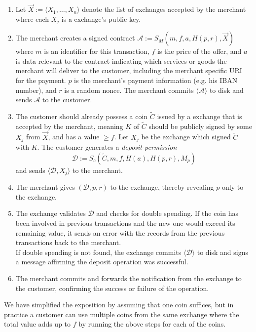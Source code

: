 \documentclass{llncs}
\begin{document}
\begin{enumerate}
\item \label{contract}
  Let $\vec{X} := \langle X_1, \ldots, X_n \rangle$ denote the list of
  exchanges accepted by the merchant where each $X_j$ is a exchange's
  public key.
\item
  The merchant creates a signed contract
    $\mathcal{A} := S_M(m, f, a, H(p, r), \vec{X})$
  where $m$ is an identifier for this transaction, $f$ is the price of the offer,
  and $a$ is data relevant
  to the contract indicating which services or goods the merchant will
  deliver to the customer, including the merchant specific URI for the payment.
  $p$ is the merchant's payment information (e.g. his IBAN number), and
  $r$ is a random nonce.  The merchant commits $\langle \mathcal{A} \rangle$
  to disk and sends $\mathcal{A}$ to the customer.
\item
  The customer should already possess a coin $\widetilde{C}$ issued by a exchange that is
  accepted by the merchant, meaning $K$ of $\widetilde{C}$ should be publicly signed by
  some $X_j$ from $\vec{X}$, and has a value $\geq f$.
  Let $X_j$ be the exchange which signed $\widetilde{C}$ with $K$.
  The customer generates a \emph{deposit-permission}
    $$\mathcal{D} := S_c(\widetilde{C}, m, f, H(a), H(p,r), M_p)$$
  and sends $\langle \mathcal{D}, X_j\rangle$ to the merchant. \label{step:first-post}
\item
  The merchant gives $(\mathcal{D}, p, r)$ to the exchange, thereby
  revealing $p$ only to the exchange.
\item
  The exchange validates $\mathcal{D}$ and checks for double spending.
  If the coin has been involved in previous transactions and the new
  one would exceed its remaining value, it sends an error
  with the records from the previous transactions back to the merchant. \\
  If double spending is not found, the exchange commits $\langle \mathcal{D} \rangle$ to disk
  and signs a message affirming the deposit operation was successful.
\item
  The merchant commits and forwards the notification from the exchange to the
  customer, confirming the success or failure
  of the operation.
\end{enumerate}

We have simplified the exposition by assuming that one coin suffices,
but in practice a customer can use multiple coins from the same
exchange where the total value adds up to $f$ by running the above
steps for each of the coins.
\end{document}
